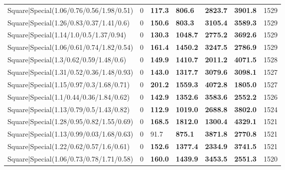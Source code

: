 \begin{tabular}{lrllllr}
 Square|Special(1.06/0.76/0.56/1.98/0.51)                      &             0   & \textbf{117.3} & \textbf{806.6}  & \textbf{2823.7} & \textbf{3901.8} &         1529 \\
 Square|Special(1.26/0.83/0.37/1.41/0.6)                       &             0   & \textbf{150.6} & \textbf{803.3}  & \textbf{3105.4} & \textbf{3589.3} &         1529 \\
 Square|Special(1.14/1.0/0.5/1.37/0.94)                        &             0   & \textbf{130.3} & \textbf{1048.7} & \textbf{2775.2} & \textbf{3692.6} &         1529 \\
 Square|Special(1.06/0.61/0.74/1.82/0.54)                      &             0   & \textbf{161.4} & \textbf{1450.2} & \textbf{3247.5} & \textbf{2786.9} &         1529 \\
 Square|Special(1.3/0.62/0.59/1.48/0.6)                        &             0   & \textbf{149.9} & \textbf{1410.7} & \textbf{2011.2} & \textbf{4071.5} &         1528 \\
 Square|Special(1.31/0.52/0.36/1.48/0.93)                      &             0   & \textbf{143.0} & \textbf{1317.7} & \textbf{3079.6} & \textbf{3098.1} &         1527 \\
 Square|Special(1.15/0.97/0.3/1.68/0.71)                       &             0   & \textbf{201.2} & \textbf{1559.3} & \textbf{4072.8} & \textbf{1805.0} &         1527 \\
 Square|Special(1.1/0.44/0.36/1.84/0.62)                       &             0   & \textbf{142.9} & \textbf{1352.6} & \textbf{3583.6} & \textbf{2552.2} &         1526 \\
 Square|Special(1.13/0.79/0.5/1.43/0.82)                       &             0   & \textbf{112.9} & \textbf{1019.0} & \textbf{2688.8} & \textbf{3802.0} &         1524 \\
 Square|Special(1.28/0.95/0.82/1.55/0.69)                      &             0   & \textbf{168.5} & \textbf{1812.0} & \textbf{1300.4} & \textbf{4329.1} &         1521 \\
 Square|Special(1.13/0.99/0.03/1.68/0.63)                      &             0   & 91.7           & \textbf{875.1}  & \textbf{3871.8} & \textbf{2770.8} &         1521 \\
 Square|Special(1.22/0.62/0.57/1.6/0.61)                       &             0   & \textbf{152.6} & \textbf{1377.4} & \textbf{2334.9} & \textbf{3741.5} &         1521 \\
 Square|Special(1.06/0.73/0.78/1.71/0.58)                      &             0   & \textbf{160.0} & \textbf{1439.9} & \textbf{3453.5} & \textbf{2551.3} &         1520 \\

\end{tabular}
